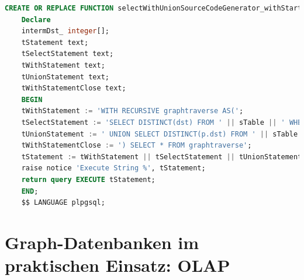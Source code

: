\begin{lstlisting}[language=SQL,caption = SQL Standard SQL Mittel,frame=single, label={StandardSQL} ]
    CREATE OR REPLACE FUNCTION selectWithUnionSourceCodeGenerator_withStartingNode(sTable text, startingNode integer ) RETURNS SETOF integer AS $$
    Declare
    intermDst_ integer[];
    tStatement text;
    tSelectStatement text;
    tWithStatement text;
    tUnionStatement text;
    tWithStatementClose text;
    BEGIN
    tWithStatement := 'WITH RECURSIVE graphtraverse AS(';
    tSelectStatement := 'SELECT DISTINCT(dst) FROM ' || sTable || ' WHERE src ='||startingNode;
    tUnionStatement := ' UNION SELECT DISTINCT(p.dst) FROM ' || sTable || ' p WHERE src IN (p.src)';
    tWithStatementClose := ') SELECT * FROM graphtraverse';
    tStatement := tWithStatement || tSelectStatement || tUnionStatement || tWithStatementClose;
    raise notice 'Execute String %', tStatement;
    return query EXECUTE tStatement;
    END;
    $$ LANGUAGE plpgsql;
\end{lstlisting}

\section{Graph-Datenbanken im praktischen Einsatz: OLAP}
